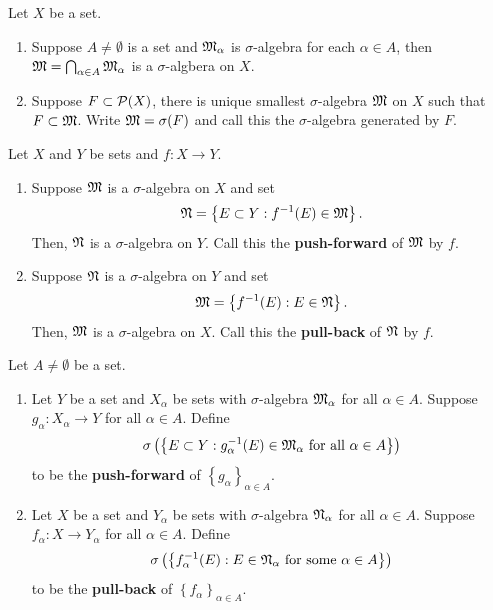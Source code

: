 \documentclass[a4paper]{article}
\begin{document}
\begin{thm}
  Let $X$ be a set.
  \begin{enumerate}
    \item Suppose $A \neq \emptyset$ is a set and
    $\mf_\alpha$ is $\sigma$-algebra for each $
    \alpha \in A$, then $\mf = \bigcap_{\alpha \in A}
    \mf_\alpha$ is a $\sigma$-algbera on $X$.

    \item Suppose $F \subset \P(X)$, there is unique
    smallest $\sigma$-algebra $\mf$ on $X$ such that
    $F \subset \mf$. Write $\mf = \sigma(F)$ and call
    this the $\sigma$-algebra generated by $F$.
  \end{enumerate}
\end{thm}

\begin{thm}
  Let $X$ and $Y$ be sets and $f: X \to Y$.
  \begin{enumerate}
    \item Suppose $\mf$ is a $\sigma$-algebra on $X$
    and set
    \[
    \nf = \left\{ E \subset Y:
    f^{-1}(E) \in \mf \right\}.
    \]
    Then, $\nf$ is a $\sigma$-algebra on $Y$.
    Call this the \textbf{push-forward} of $\mf$
    by $f$.

    \item Suppose $\nf$ is a $\sigma$-algebra
    on $Y$ and set
    \[
    \mf = \left\{ f^{-1}(E) : E \in \nf \right\}.
    \]
    Then, $\mf$ is a $\sigma$-algebra on $X$. Call
    this the \textbf{pull-back} of $\nf$ by $f$.
  \end{enumerate}
\end{thm}

\begin{defi}
  Let $A \neq \emptyset$ be a set.
  \begin{enumerate}
    \item Let $Y$ be a set and $X_\alpha$ be sets
    with $\sigma$-algebra $\mf_\alpha$ for all
    $\alpha \in A$. Suppose $g_\alpha : X_\alpha
    \to Y$ for all $\alpha \in A$. Define
    \[
    \sigma \left( \left\{ E \subset Y: g_\alpha^{-1}(E)
    \in \mf_\alpha \text{ for all $\alpha \in A$}
    \right\} \right)
    \]
    to be the \textbf{push-forward} of $\left\{ g_\alpha
    \right\}_{\alpha \in A}$.

    \item Let $X$ be a set and $Y_\alpha$ be sets with
    $\sigma$-algebra $\nf_\alpha$ for all $\alpha \in A$.
    Suppose $f_\alpha : X \to Y_\alpha$ for all $\alpha \in
    A$. Define
    \[
    \sigma \left( \left\{ f_\alpha^{-1}(E) :
    E \in \nf_\alpha \text{ for some $\alpha \in A$}
    \right\} \right)
    \]
    to be the \textbf{pull-back} of $\left\{ f_\alpha
     \right\}_{\alpha \in A}$.
  \end{enumerate}
\end{defi}
\end{document}
